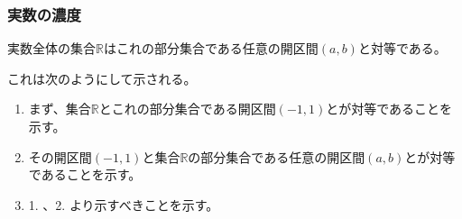 \documentclass[dvipdfmx]{jsarticle}
\begin{document}
\subsubsection{実数の濃度}
\begin{thm}\label{1.2.7.5}
実数全体の集合$\mathbb{R}$はこれの部分集合である任意の開区間$(a,b)$と対等である。
\end{thm}\par
これは次のようにして示される。
\begin{enumerate}
\item
  まず、集合$\mathbb{R}$とこれの部分集合である開区間$( - 1,1)$とが対等であることを示す。
\item
  その開区間$( - 1,1)$と集合$\mathbb{R}$の部分集合である任意の開区間$(a,b)$とが対等であることを示す。
\item
  1. 、2. より示すべきことを示す。
\end{enumerate}
\end{document}
